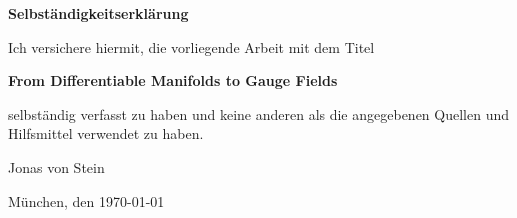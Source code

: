 \documentclass[a4paper,11pt,twoside,openright]{report}
\newcommand{\thesistitleEng}{From Differentiable Manifolds to Gauge Fields}
\newcommand{\authorname}{Jonas von Stein}
\newcommand{\thesisdate}{\today}
\begin{document}

\cleardoublepage
{}



\newpage
\thispagestyle{empty}

\vspace*{1cm}
{\huge \textbf{Selbst{\"a}ndigkeitserkl{\"a}rung}}\\
\vspace*{1.5cm}

Ich versichere hiermit, die vorliegende Arbeit mit dem Titel

\begin{center}
    \textbf{\thesistitleEng}\\
\end{center}

selbst{\"a}ndig verfasst zu haben und keine anderen als die angegebenen Quellen und Hilfsmittel verwendet zu haben.

\vspace*{3cm}

\authorname

\vspace*{1cm}
M{\"u}nchen, den \thesisdate
\end{document}
